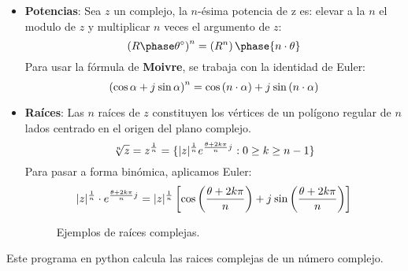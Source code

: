 \documentclass[
	12pt, %
	fleqn, %
	a4paper, %
	oneside, %
]{LegrandOrangeBook}
\begin{document}
\begin{itemize}
\item \textbf{Potencias}: Sea $z$ un complejo, la $n$-ésima potencia de z es: elevar a la $n$ el modulo de $z$ y multiplicar $n$ veces el argumento de $z$:
\begin{equation*}
\left(\fase{R}{\theta}\right)^n=\left(R^n\right)\phase{n\cdot\theta}
\end{equation*}
Para usar la fórmula de \textbf{Moivre}, se trabaja con la identidad de Euler:
\begin{equation*}
\left(\cos\alpha+{j\mkern1mu}\sin\alpha\right)^n=\cos\left(n\cdot\alpha\right)+{j\mkern1mu}\sin\left(n\cdot\alpha\right)
\end{equation*}
\item \textbf{Raíces}: Las $n$ raíces de $z$ constituyen los vértices de un polígono regular de $n$ lados centrado en el origen del plano complejo.
\begin{equation*}
\sqrt[n]{z}=z^{\frac{1}{n}}=\lbrace|z|^{\frac{1}{n}}e^{\frac{\theta+2k\pi}{n}{j\mkern1mu}}:0\geq k \geq n-1\rbrace
\end{equation*}
Para pasar a forma binómica, aplicamos Euler:
\begin{equation*}
|z|^{\frac{1}{n}}\cdot e^{\frac{\theta+2k\pi}{n}{j\mkern1mu}}=|z|^{\frac{1}{n}}\left[\cos\left(\frac{\theta+2k\pi}{n}\right)+{j\mkern1mu}\sin\left(\frac{\theta+2k\pi}{n}\right)\right]
\end{equation*}
\begin{figure}[H]
\centering
{}
\caption{Ejemplos de raíces complejas.}
\end{figure}
\end{itemize}
Este programa en python calcula las raices complejas de un número complejo.
\end{document}
